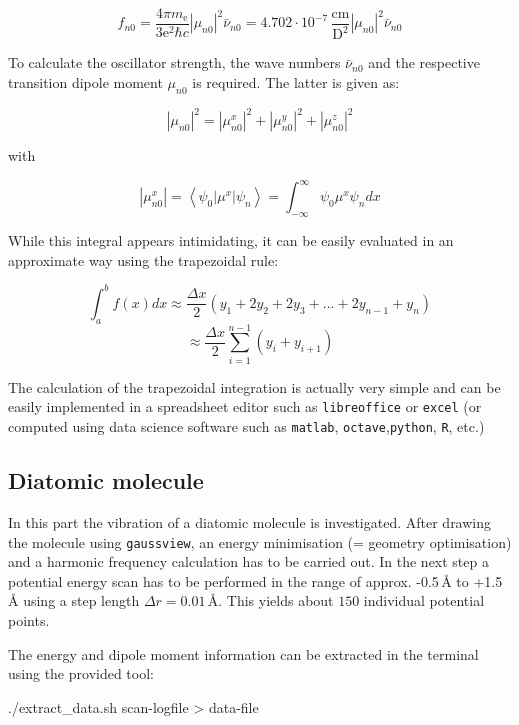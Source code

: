 \documentclass[
  letterpaper,
]{article}
\newenvironment{Shaded}{\begin{snugshade}}{\end{snugshade}}
\newcommand{\ExtensionTok}[1]{\textcolor[rgb]{0.00,0.23,0.31}{#1}}
\newcommand{\NormalTok}[1]{\textcolor[rgb]{0.00,0.23,0.31}{#1}}
\newcommand{\OperatorTok}[1]{\textcolor[rgb]{0.37,0.37,0.37}{#1}}
\begin{document}
\[
f_{n0} = \frac{4\pi m_{\mathrm{e}}}{3\mathrm{e}^2\hbar c}|\mu_{n0}|^2 \bar{\nu}_{n0}= 4.702 \cdot 10^{-7}\,\mathrm{\frac{cm}{D^2}}|\mu_{n0}|^2 \bar{\nu}_{n0}
\]

To calculate the oscillator strength, the wave numbers
\(\bar{\nu}_{n0}\) and the respective transition dipole moment
\(\mu_{n0}\) is required. The latter is given as:

\[
|\mu_{n0}|^2 = |\mu_{n0}^x|^2 +  |\mu_{n0}^y|^2 + |\mu_{n0}^z|^2
\]

with

\[
|\mu_{n0}^x| = \left < \psi_0 | \mu^x | \psi_n \right > = \int_{-\infty}^{\infty} \psi_0 \mu^x \psi_n dx
\]

While this integral appears intimidating, it can be easily evaluated in
an approximate way using the trapezoidal rule:

\[
\int_a^b f(x) dx \approx \frac{\Delta x}{2} (y_1 + 2y_2 +2 y_3+ ... + 2y_{n-1}+y_n)
\] \[
\approx \frac{\Delta x}{2} \sum_{i=1}^{n-1} (y_i + y_{i+1})
\]

The calculation of the trapezoidal integration is actually very simple
and can be easily implemented in a spreadsheet editor such as
\texttt{libreoffice} or \texttt{excel} (or computed using data science
software such as \texttt{matlab}, \texttt{octave},\texttt{python},
\texttt{R}, etc.)

\hypertarget{diatomic-molecule}{%
\subsection*{Diatomic molecule}\label{diatomic-molecule}}


In this part the vibration of a diatomic molecule is investigated. After
drawing the molecule using \texttt{gaussview}, an energy minimisation (=
geometry optimisation) and a harmonic frequency calculation has to be
carried out. In the next step a potential energy scan has to be
performed in the range of approx. -0.5\(\,\)Å to +1.5\(\,\)Å using a
step length \(\Delta r = 0.01\,\)Å. This yields about \(150\) individual
potential points.

The energy and dipole moment information can be extracted in the
terminal using the provided tool:

\begin{Shaded}
\begin{Highlighting}[]
\ExtensionTok{./extract\_data.sh}\NormalTok{  scan{-}logfile   }\OperatorTok{\textgreater{}}\NormalTok{  data{-}file}
\end{Highlighting}
\end{Shaded}
\end{document}
